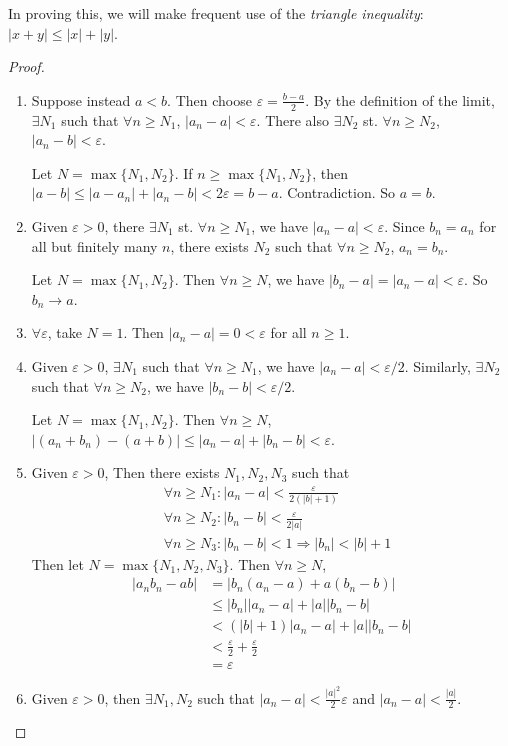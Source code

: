 \documentclass[a4paper]{article}
\begin{document}
In proving this, we will make frequent use of the \emph{triangle inequality}: $|x + y|\leq |x| + |y|$.
\begin{proof}\leavevmode
  \begin{enumerate}
    \item Suppose instead $a < b$. Then choose $\varepsilon = \frac{b - a}{2}$. By the definition of the limit, $\exists N_1$ such that $\forall n\geq N_1$, $|a_n - a| < \varepsilon$. There also $\exists N_2$ st. $\forall n\geq N_2$, $|a_n - b| < \varepsilon$.

      Let $N = \max\{N_1, N_2\}$. If $n\geq \max\{N_1, N_2\}$, then $|a - b| \leq |a - a_n| + |a_n - b| < 2\varepsilon = b - a.$
      Contradiction. So $a = b$.
    \item Given $\varepsilon > 0$, there $\exists N_1$ st. $\forall n\geq N_1$, we have $|a_n - a| < \varepsilon$. Since $b_n = a_n$ for all but finitely many $n$, there exists $N_2$ such that $\forall n\geq N_2$, $a_n = b_n$.

      Let $N = \max\{N_1, N_2\}$. Then $\forall n\geq N$, we have $|b_n - a| = |a_n - a| < \varepsilon$. So $b_n\to a$.
    \item $\forall \varepsilon$, take $N = 1$. Then $|a_n - a| = 0 < \varepsilon$ for all $n \geq 1$.
    \item Given $\varepsilon > 0$, $\exists N_1$ such that $\forall n\geq N_1$, we have $|a_n - a| < \varepsilon/2$. Similarly, $\exists N_2$ such that $\forall n\geq N_2$, we have $|b_n - b| < \varepsilon/2$.

      Let $N = \max\{N_1, N_2\}$. Then $\forall n \geq N$, $|(a_n + b_n) - (a + b)| \leq |a_n - a| + |b_n - b| < \varepsilon$.
    \item Given $\varepsilon > 0$, Then there exists $N_1, N_2, N_3$ such that
      \begin{align*}
        &\forall n\geq N_1: |a_n - a| < \frac{\varepsilon}{2(|b| + 1)}\\
        &\forall n\geq N_2: |b_n - b| < \frac{\varepsilon}{2|a|}\\
        &\forall n\geq N_3: |b_n - b| < 1 \Rightarrow |b_n| < |b| +1
      \end{align*}
      Then let $N = \max\{N_1, N_2, N_3\}$. Then $\forall n\geq N$,
      \begin{align*}
        |a_nb_n - ab| &= |b_n(a_n - a) + a(b_n - b)|\\
        &\leq |b_n| |a_n - a| + |a||b_n - b|\\
        &< (|b| + 1) |a_n - a| + |a||b_n - b|\\
        &< \frac{\varepsilon}{2} + \frac{\varepsilon}{2}\\
        &= \varepsilon
      \end{align*}
    \item Given $\varepsilon > 0$, then $\exists N_1, N_2$ such that $|a_n - a| < \frac{|a|^2}{2}\varepsilon$ and $|a_n - a| < \frac{|a|}{2}$.


\end{enumerate}
\end{proof}
\end{document}
